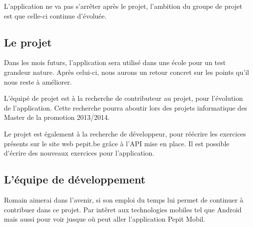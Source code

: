 L'application ne va pas s'arrêter après le projet, l'ambition du groupe de projet est que celle-ci continue d'évoluée.


\subsection{Le projet}
Dans les mois futurs, l'application sera utilisé dans une école pour un test grandeur nature. Après celui-ci, nous aurons un retour concret sur les points qu'il nous reste à améliorer.


L'équipé de projet est à la recherche de contributeur au projet, pour l'évolution de l'application. Cette recherche pourra aboutir lors des projets informatique des Master de la promotion 2013/2014.


Le projet est également à la recherche de développeur, pour réécrire les exercices présents sur le site web pepit.be gr\^{a}ce à l'API mise en place. Il est possible d'écrire des nouveaux exercices pour l'application.

\subsection{L'équipe de développement}
Romain aimerai dans l'avenir, si son emploi du temps lui permet de continuer à contribuer dans ce projet. Par int\^{e}ret aux technologies mobiles tel que Android mais aussi pour voir jusque où peut aller l'application Pepit Mobil. 
